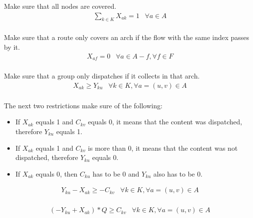 Make sure that all nodes are covered. \\

\begin{align*}
        &\sum_{k \in K}{X_{ak}=1} & \forall a \in A\\
\end{align*}

Make sure that a route only covers an arch if the flow with the same index passes by it. \\

\begin{align*}
        &X_{af} = 0 & \forall a \in A - f,  \forall f \in F\\
\end{align*}

Make sure that a group only dispatches if it collects in that arch. \\

\begin{align*}
        &X_{ak} \geq Y_{ku} & \forall k \in K, \forall a = (u,v) \in A \\
\end{align*}

The next two restrictions make sure of the following: \\

\begin{itemize}
    \item If $X_{ak}$ equals 1 and $C_{kv}$ equals 0, it means that the content was dispatched, therefore $Y_{ku}$ equals 1. \\
    \item If $X_{ak}$ equals 1 and $C_{kv}$ is more than 0, it means that the content was not dispatched, therefore $Y_{ku}$ equals 0. \\ 
    \item If $X_{ak}$ equals 0, then $C_{ku}$ has to be 0 and $Y_{ku}$ also has to be 0. \\
\end{itemize}

\begin{align*}
        &Y_{ku} - X_{ak} \geq -C_{kv} & \forall k \in K, \forall a = (u,v) \in A \\
\end{align*}

\begin{align*}
        &(-Y_{ku} + X_{ak}) * Q \geq C_{kv} & \forall k \in K, \forall a = (u,v) \in A \\
\end{align*}
